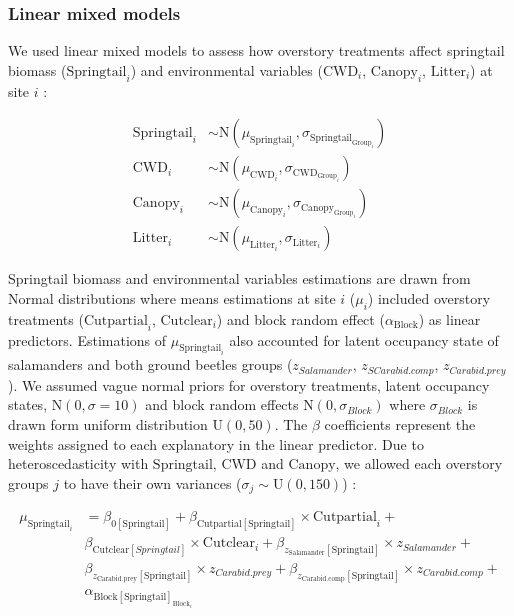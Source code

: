\subsubsection{Linear mixed models} 

We used linear mixed models to assess how overstory treatments affect springtail biomass ($\text{Springtail}_{i}$) and 
environmental variables ($\text{CWD}_{i}$, $\text{Canopy}_{i}$, $\text{Litter}_{i}$) at site $i$ :

\begin{align}
  \text{Springtail}_{i} &\sim \text{N} (\mu_{\text{Springtail}_i}, \sigma_{\text{Springtail}_{\text{Group}_i}}) \nonumber \\
  \text{CWD}_{i} &\sim \text{N} (\mu_{\text{CWD}_i}, \sigma_{\text{CWD}_{\text{Group}_i}}) \\
  \text{Canopy}_{i} &\sim \text{N} (\mu_{\text{Canopy}_i}, \sigma_{\text{Canopy}_{\text{Group}_i}}) \nonumber \\
  \text{Litter}_{i} &\sim \text{N} (\mu_{\text{Litter}_i}, \sigma_{\text{Litter}_{i}}) \nonumber 
\end{align}

Springtail biomass and environmental variables estimations are drawn from Normal distributions where means estimations at site $i$ ($\mu_{i}$) included overstory treatments ($\text{Cutpartial}_i$, $\text{Cutclear}_i$) and block random effect ($\alpha_{\text{Block}}$) as linear predictors. 
Estimations of $\mu_{\text{Springtail}_i}$ also accounted for latent occupancy state of salamanders and both ground beetles groups ($z_{Salamander}$, $z_{SCarabid.comp}$, $z_{Carabid.prey}$ ). 
We assumed vague normal priors for overstory treatments, latent occupancy states, $\text{N}(0, \sigma = 10)$ and block random effects $\text{N}(0, \sigma_{Block})$ 
where $\sigma_{Block}$ is drawn form uniform distribution $\text{U}(0, 50)$. 
The $\beta$ coefficients represent the weights assigned to each explanatory in the linear predictor.
Due to heteroscedasticity with $\text{Springtail}$, $\text{CWD}$ and $\text{Canopy}$, we allowed each overstory groups $j$ to have their own variances ($\sigma_j \sim \text{U}(0,150)$) :

\begin{align}
  \mu_{\text{Springtail}_i} &= \beta_{0[\text{Springtail}]} + \beta_{\text{Cutpartial}[\text{Springtail}]} \times \text{Cutpartial}_i + \nonumber\\
  &\beta_{\text{Cutclear}[Springtail]} \times \text{Cutclear}_i + \beta_{z_{\text{Salamander}}[\text{Springtail}]} \times z_{Salamander} +  \nonumber\\
  &\beta_{z_{\text{Carabid.prey}}[\text{Springtail}]} \times z_{Carabid.prey} + \beta_{z_{\text{Carabid.comp}}[\text{Springtail}]} \times z_{Carabid.comp} + \nonumber\\
  &\alpha_{\text{Block}[\text{Springtail}]_{\text{Block}_i}} \nonumber
\end{align}

